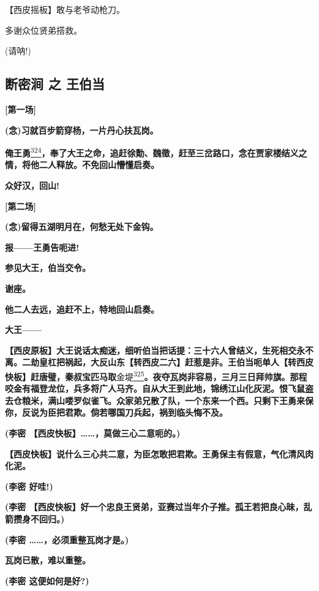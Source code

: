 【西皮摇板】敢与老爷动枪刀。

多谢众位贤弟搭救。

(请呐!)

\newpage
\hypertarget{ux65adux5bc6ux6da7-ux4e4b-ux738bux4f2fux5f53}{%
\subsection{断密涧 之
王伯当}\label{ux65adux5bc6ux6da7-ux4e4b-ux738bux4f2fux5f53}}

\textbf{{[}第一场{]}}

\textbf{(念)习就百步箭穿杨，一片丹心扶瓦岗。}

\textbf{俺王勇}\protect\hyperlink{fn324}{\textsuperscript{324}}\textbf{，奉了大王之命，追赶徐勣、魏徵，赶至三岔路口，念在贾家楼结义之情，将他二人释放。不免回山懵懂启奏。}

\textbf{众好汉，回山!}

\textbf{{[}第二场{]}}

\textbf{(念)留得五湖明月在，何愁无处下金钩。}

\textbf{报------王勇告呃进!}

\textbf{参见大王，伯当交令。}

\textbf{谢座。}

\textbf{他二人去远，追赶不上，特地回山启奏。}

\textbf{大王------}

\textbf{【西皮原板】大王说话太痴迷，细听伯当把话提：三十六人曾结义，生死相交永不离。二劫皇杠把祸起，大反山东【转西皮二六】赶惹是非。王伯当呃单人【转西皮快板】赶唐璧，秦叔宝匹马取}金堤\protect\hyperlink{fn325}{\textsuperscript{325}}\textbf{。夜夺瓦岗非容易，三月三日拜帅旗。那程咬金有福登龙位，兵多将广人马齐。自从大王到此地，锦绣江山化灰泥。恨飞鼠盗去仓粮米，满山喽罗似雀飞。众家弟兄散了队，一个东来一个西。只剩下王勇来保你，反说为臣把君欺。倘若哪国刀兵起，祸到临头悔不及。}

\textbf{(李密 【西皮快板】\ldots{}\ldots{}，莫做三心二意呃的。)}

\textbf{【西皮快板】说什么三心共二意，为臣怎敢把君欺。王勇保主有假意，气化清风肉化泥。}

\textbf{(李密 好哇!)}

\textbf{(李密
【西皮快板】好一个忠良王贤弟，亚赛过当年介子推。孤王若把良心昧，乱箭攒身不回归。)}

\textbf{(李密 \ldots{}\ldots{}，必须重整瓦岗才是。)}

\textbf{瓦岗已散，难以重整。}

\textbf{(李密 这便如何是好?)}

